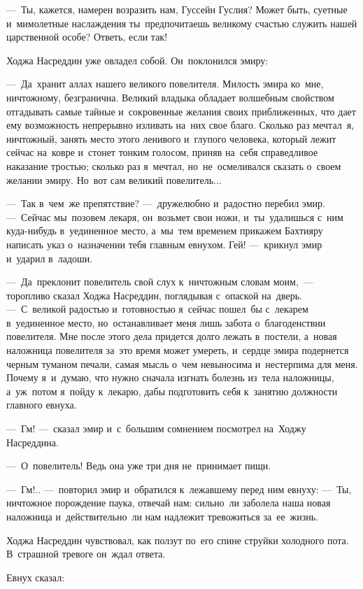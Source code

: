 \documentclass[12pt,a4paper]{book}
\begin{document}
—~Ты, кажется, намерен возразить нам, Гуссейн Гуслия? Может быть, суетные и~мимолетные наслаждения ты~предпочитаешь великому счастью служить нашей царственной особе? Ответь, если так!

Ходжа Насреддин уже овладел собой. Он~поклонился эмиру:

—~Да~хранит аллах нашего великого повелителя. Милость эмира ко~мне, ничтожному, безгранична. Великий владыка обладает волшебным свойством отгадывать самые тайные и~сокровенные желания своих приближенных, что дает ему возможность непрерывно изливать на~них свое благо. Сколько раз мечтал~я, ничтожный, занять место этого ленивого и~глупого человека, который лежит сейчас на~ковре и~стонет тонким голосом, приняв на~себя справедливое наказание тростью; сколько раз я~мечтал, но~не~осмеливался сказать о~своем желании эмиру. Но~вот сам великий повелитель...

—~Так в~чем~же препятствие? —~дружелюбно и~радостно перебил эмир. —~Сейчас мы~позовем лекаря, он~возьмет свои ножи, и~ты~удалишься с~ним куда-нибудь в~уединенное место, а~мы~тем временем прикажем Бахтияру написать указ о~назначении тебя главным евнухом. Гей! —~крикнул эмир и~ударил в~ладоши.

—~Да~преклонит повелитель свой слух к~ничтожным словам моим,~— торопливо сказал Ходжа Насреддин, поглядывая с~опаской на~дверь. —~С~великой радостью и~готовностью я~сейчас пошел~бы с~лекарем в~уединенное место, но~останавливает меня лишь забота о~благоденствии повелителя. Мне после этого дела придется долго лежать в~постели, а~новая наложница повелителя за~это время может умереть, и~сердце эмира подернется черным туманом печали, самая мысль о~чем невыносима и~нестерпима для меня. Почему я~и~думаю, что нужно сначала изгнать болезнь из~тела наложницы, а~уж~потом я~пойду к~лекарю, дабы подготовить себя к~занятию должности главного евнуха.

—~Гм! —~сказал эмир и~с~большим сомнением посмотрел на~Ходжу Насреддина.

—~О~повелитель! Ведь она уже три дня не~принимает пищи.

—~Гм!.. —~повторил эмир и~обратился к~лежавшему перед ним евнуху: —~Ты, ничтожное порождение паука, отвечай нам: сильно~ли заболела наша новая наложница и~действительно~ли нам надлежит тревожиться за~ее~жизнь.

Ходжа Насреддин чувствовал, как ползут по~его спине струйки холодного пота. В~страшной тревоге он~ждал ответа.

Евнух сказал:
\end{document}
